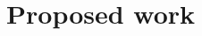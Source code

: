 \documentclass[10pt, onecolumn]{report}
\begin{document}
\maketitle

\tableofcontents

\newpage



\chapter{Proposed work}







 
\end{document}

